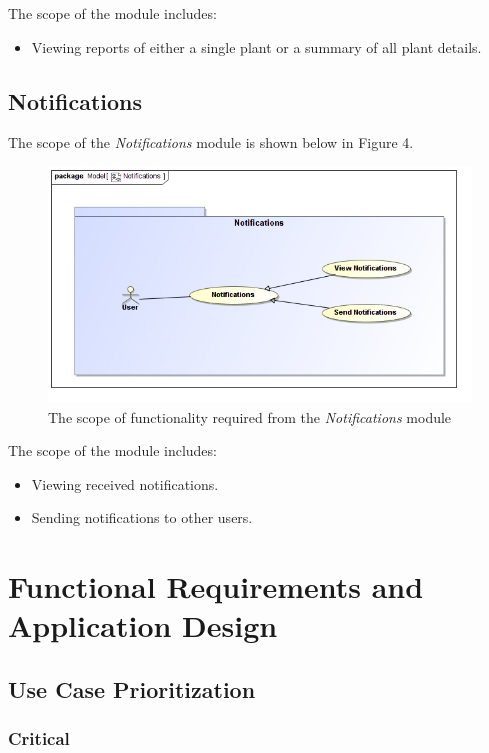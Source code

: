 \documentclass{article}
\begin{document}
		The scope of the \emph{} module includes:
		
		\begin{itemize}
			\item Viewing reports of either a single plant or a summary of all plant details.
		\end{itemize}
		
	\pagebreak
	\subsection{Notifications}
		The scope of the \emph{Notifications} module is shown below in Figure 4.
		
		\begin{figure}[H]
			\centering
			\includegraphics[width=\textwidth]{../software-architecture-specification/Notifications.jpg}
			\caption{The scope of functionality required from the \emph{Notifications} module}
		\end{figure}
		
		The scope of the \emph{} module includes:
		
		\begin{itemize}
			\item Viewing received notifications.
			\item Sending notifications to other users.
		\end{itemize}

\section{Functional Requirements and Application Design}
	\subsection{Use Case Prioritization}
		\subsubsection{Critical}
\end{document}
